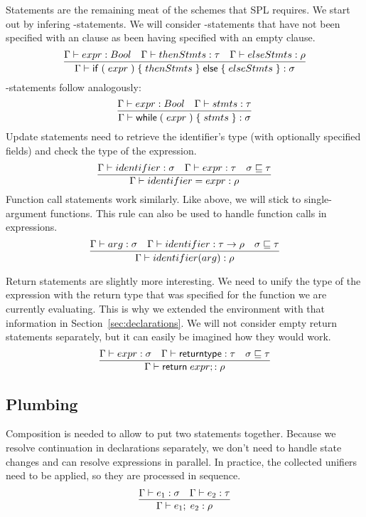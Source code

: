 Statements are the remaining meat of the schemes that SPL requires.
We start out by infering -statements.
We will consider -statements that have not been specified with an  clause as been having specified with an empty  clause.
\[
    \infer{\Gamma \vdash \mathsf{if}\; (\; expr\;)\; \{\; thenStmts\; \}\;
    \mathsf{else}\; \{\; elseStmts\; \} : \sigma}{
            \Gamma \vdash expr : Bool &
            \Gamma \vdash thenStmts : \tau &
            \Gamma \vdash elseStmts : \rho
    }
\]
-statements follow analogously:
\[
    \infer{\Gamma \vdash \mathsf{while}\; (\; expr\;)\; \{\; stmts\; \}: \sigma}{
            \Gamma \vdash expr : Bool &
            \Gamma \vdash stmts : \tau
    }
\]
Update statements need to retrieve the identifier's type (with optionally specified fields) and check the type of the expression.
\[
    \infer{\Gamma \vdash identifier = expr : \rho}{
        \Gamma \vdash identifier : \sigma &
        \Gamma \vdash expr : \tau &
        \sigma \sqsubseteq \tau
    }
\]
Function call statements work similarly.
Like above, we will stick to single-argument functions.
This rule can also be used to handle function calls in expressions.
\[
    \infer{\Gamma \vdash identifier(arg) : \rho}{
        \Gamma \vdash arg : \sigma &
        \Gamma \vdash identifier : \tau \to \rho &
        \sigma \sqsubseteq \tau
    }
\]

Return statements are slightly more interesting.
We need to unify the type of the expression with the return type that was specified for the function we are currently evaluating.
This is why we extended the environment with that information in Section~\ref{sec:declarations}.
We will not consider empty return statements separately, but it can easily be imagined how they would work.
\[
    \infer{\Gamma \vdash \mathsf{return}\; expr; : \rho}{
        \Gamma \vdash expr : \sigma &
        \Gamma \vdash \mathsf{returntype} : \tau &
        \sigma \sqsubseteq \tau
    }
\]

\subsection{Plumbing}

Composition is needed to allow to put two statements together.
Because we resolve continuation in declarations separately, we don't need to handle state changes and can resolve expressions in parallel.
In practice, the collected unifiers need to be applied, so they are processed in sequence.
\[
    \infer{\Gamma \vdash e_1;\;e_2 : \rho}{
        \Gamma \vdash e_1 : \sigma &
        \Gamma \vdash e_2 : \tau
    }
\]

